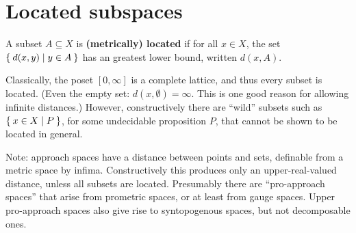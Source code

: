 \documentclass{article}
\def\Rp{[0,\infty]}
\begin{document}
\section{Located subspaces}
\label{sec:located}

\begin{defn}
  A subset $A\subseteq X$ is \textbf{(metrically) located} if for all $x\in X$, the set $\Set{ d(x,y) | y\in A }$ has an greatest lower bound, written $d(x,A)$.
\end{defn}

Classically, the poset $\Rp$ is a complete lattice, and thus every subset is located.
(Even the empty set: $d(x,\emptyset)=\infty$.
This is one good reason for allowing infinite distances.)
However, constructively there are ``wild'' subsets such as $\Set{x\in X | P}$, for some undecidable proposition $P$, that cannot be shown to be located in general.

Note: approach spaces have a distance between points and sets, definable from a metric space by infima.
Constructively this produces only an upper-real-valued distance, unless all subsets are located.
Presumably there are ``pro-approach spaces'' that arise from prometric spaces, or at least from gauge spaces.
Upper pro-approach spaces also give rise to syntopogenous spaces, but not decomposable ones.




\end{document}
